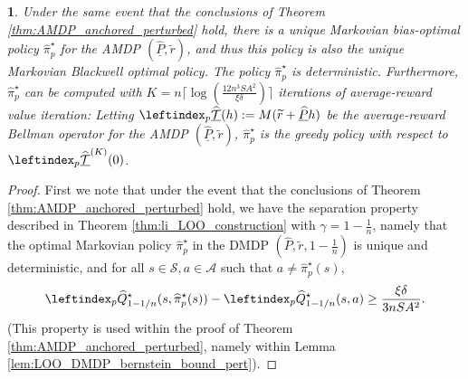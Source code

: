 \documentclass{article}
\theoremstyle{plain}
\theoremstyle{plain}
\newtheorem{lem}[thm]{\protect\lemmaname}
\theoremstyle{remark}
\theoremstyle{plain}
\theoremstyle{plain}
\providecommand{\lemmaname}{Lemma}
\newcommand{\Phat}{\widehat{P}}
\newcommand{\Qhat}{\widehat{Q}}
\newcommand{\pihat}{\widehat{\pi}}
\newcommand{\A}{\mathcal{A}}
\renewcommand{\S}{\mathcal{S}}
\newcommand{\Phatanc}{\underline{\Phat}}
\newcommand{\Qhatpert}{\leftindex_p{\Qhat}}
\newcommand{\pihatpert}{\pihat^\star_p}
\newcommand{\Thatancpert}{\leftindex_p{\underline{\widehat{\mathcal{T}}}} }
\begin{document}
\begin{lem}
    \label{lem:anchpert_exact_VI_convergence}
    Under the same event that the conclusions of Theorem \ref{thm:AMDP_anchored_perturbed} hold, there is a unique Markovian bias-optimal policy $\pihatpert$ for the AMDP $(\Phatanc, \widetilde{r})$, and thus this policy is also the unique Markovian Blackwell optimal policy. The policy $\pihatpert$ is deterministic.
    Furthermore, $\pihatpert$ can be computed with $K = n \lceil \log\left( \frac{12 n^3 S A^2}{\xi \delta}\right) \rceil$ iterations of average-reward value iteration: Letting $\Thatancpert(h) := M(\widetilde{r} + \Phatanc h)$ be the average-reward Bellman operator for the AMDP $(\Phatanc, \widetilde{r})$, $\pihatpert$ is the greedy policy with respect to $\Thatancpert^{(K)}(0)$.
\end{lem}
\begin{proof}
First we note that under the event that the conclusions of Theorem \ref{thm:AMDP_anchored_perturbed} hold, we have the separation property described in Theorem \ref{thm:li_LOO_construction} with $\gamma = 1 - \frac{1}{n}$, namely that the optimal Markovian policy $\pihatpert$ in the DMDP $(\Phat, \widetilde{r}, 1 - \frac{1}{n})$ is unique and deterministic, and for all $s \in \S, a \in \A$ such that $a \neq \pihatpert(s)$,
\begin{align}
    \Qhatpert_{1-1/n}^\star(s, \pihatpert(s)) - \Qhatpert_{1-1/n}^\star(s,a) \geq \frac{\xi \delta }{3 nS A^2}. \label{eq:separation_cond_anch_pert}
\end{align}
(This property is used within the proof of Theorem \ref{thm:AMDP_anchored_perturbed}, namely within Lemma \ref{lem:LOO_DMDP_bernstein_bound_pert}).


\end{proof}
\end{document}
